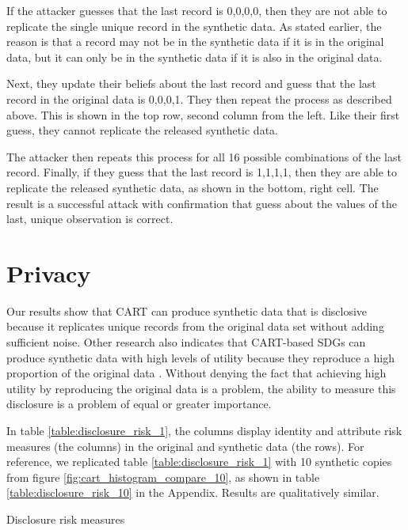 \documentclass[runningheads]{llncs}
\begin{document}
If the attacker guesses that the last record is 0,0,0,0, then they are not able to replicate the single unique record in the synthetic data.  As stated earlier, the reason is that a record may not be in the synthetic data if it is in the original data, but it can only be in the synthetic data if it is also in the original data. 

Next, they update their beliefs about the last record and guess that the last record in the original data is 0,0,0,1.  They then repeat the process as described above.  This is shown in the top row, second column from the left.  Like their first guess, they cannot replicate the released synthetic data.  

The attacker then repeats this process for all 16 possible combinations of the last record.  Finally, if they guess that the last record is 1,1,1,1, then they are able to replicate the released synthetic data, as shown in the bottom, right cell.  The result is a successful attack with confirmation that guess about the values of the last, unique observation is correct.

\section{Privacy}

Our results show that CART can produce synthetic data that is disclosive because it replicates unique records from the original data set without adding sufficient noise.  Other research also indicates that CART-based SDGs can produce synthetic data with high levels of utility because they reproduce a high proportion of the original data \cite{manrique2018bayesian}.  Without denying the fact that achieving high utility by reproducing the original data is a problem, the ability to measure this disclosure is a problem of equal or greater importance.

In table \ref{table:disclosure_risk_1}, the columns display identity and attribute risk measures (the columns) in the original and synthetic data (the rows).  For reference, we replicated table \ref{table:disclosure_risk_1} with 10 synthetic copies from figure \ref{fig:cart_histogram_compare_10}, as shown in table \ref{table:disclosure_risk_10} in the Appendix.  Results are qualitatively similar.  

\begin{table}[]
    \centering
    \caption{Disclosure risk measures}
    
    \label{table:disclosure_risk_1}
\end{table}
\end{document}
